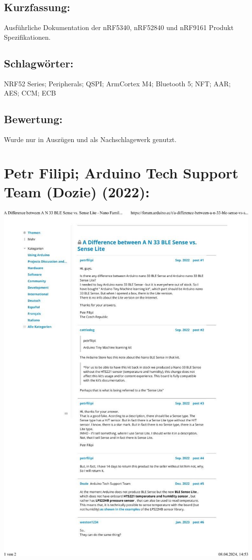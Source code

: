 \subsection*{Kurzfassung:}
Ausführliche Dokumentation der nRF5340, nRF52840 und nRF9161 Produkt Spezifikationen.
\subsection*{Schlagwörter:}
NRF52 Series; Peripherals; QSPI; ArmCortex M4; Bluetooth 5; NFT; AAR; AES; CCM; ECB
\subsection*{Bewertung:}
Wurde nur in Auszügen und als Nachschlagewerk genutzt. 

\section*{Petr Filipi; Arduino Tech Support Team (Dozie) (2022):}
\begin{minipage}{0.5\textwidth}
	\includegraphics[width=\linewidth]{../Appendix/Literaturverzeichnis/img/Filipi.jpg}
\end{minipage}
